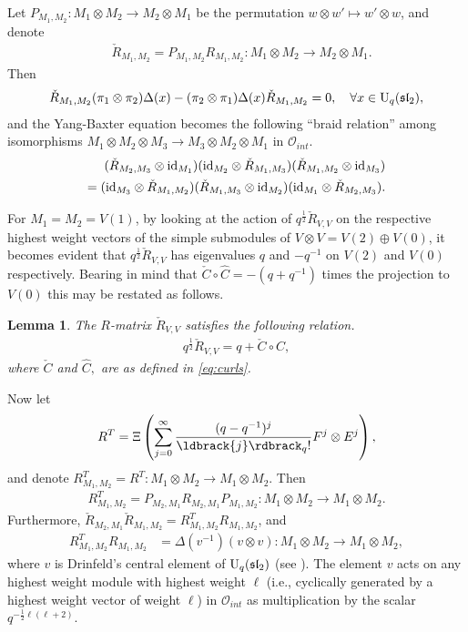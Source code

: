 \documentclass[12pt]{amsart}
\newtheorem{lemma}[theorem]{Lemma}
\theoremstyle{definition}
\theoremstyle{remark}
\numberwithin{equation}{section}
\newcommand{\CO}{{\mathcal O}}
\newcommand{\id}{{\rm{id}}}
\newcommand{\inv}{^{-1}}
\newcommand{\U}{{\rm{U}}}
\newcommand{\fsl}{{\mathfrak {sl}}}
\newcommand{\qint}[1]{\ldbrack{#1}\rdbrack_q }
\begin{document}
Let $
P_{M_1, M_2}: M_1\otimes M_2 \longrightarrow M_2\otimes M_1
$
be the permutation $w\otimes w' \mapsto w'\otimes w$,  and denote
\[
\begin{aligned}
&\check{R}_{M_1, M_2}= P_{M_1, M_2}R_{M_1, M_2}: M_1\otimes M_2 \longrightarrow M_2\otimes M_1. \end{aligned}
\]
Then 
\begin{eqnarray}\label{eq:commute}
\check{R}_{M_1, M_2}  (\pi_1\otimes \pi_2)\Delta(x) - (\pi_2\otimes \pi_1)\Delta(x)\check{R}_{M_1, M_2}=0, \quad \forall x\in \U_q(\fsl_2), 
\end{eqnarray}
and the Yang-Baxter equation becomes the  following ``braid relation''  among isomorphisms
$M_1\otimes M_2\otimes M_3\longrightarrow M_3\otimes M_2\otimes M_1$ in $\CO_{int}$.
\[
\begin{aligned}
(\check{R}_{M_2, M_3}\otimes\id_{M_1})  (\id_{M_2}\otimes\check{R}_{M_1, M_3})  
(\check{R}_{M_1, M_2}\otimes\id_{M_3})\\
=
(\id_{M_3}\otimes\check{R}_{M_1, M_2})  (\check{R}_{M_1, M_3}\otimes\id_{M_2})(\id_{M_1}\otimes\check{R}_{M_2, M_3}).   
\end{aligned}
\]


For $M_1=M_2=V(1)$, by looking at the action of  $q^{\frac{1}{2}}\check{R}_{V, V}$ on the respective highest weight 
vectors of the simple submodules of $V\otimes V=V(2)\oplus V(0)$, it becomes evident that $q^{\frac{1}{2}}\check{R}_{V, V}$ 
 has eigenvalues $q$ and $-q^{-1}$ on $V(2)$ and $V(0)$ respectively. Bearing in mind that $\check{C}\circ\hat{C}=-(q+q\inv)$
times the projection to $V(0)$ this may be restated as follows.
\begin{lemma}\label{eq:normal-R} The $R$-matrix $\check{R}_{V, V}$ satisfies the following relation. 
\begin{eqnarray}\label{lem:normal-R}
q^{\frac{1}{2}}\check{R}_{V, V}=q+\check{C}\circ\hat{C},  
\end{eqnarray}
where $\check{C}$ and $\hat{C},$ are as defined in \eqref{eq:curls}. 
\end{lemma}

Now let 
\begin{eqnarray}
R^T = \Xi \left(\sum_{j=0}^\infty \frac{(q-q^{-1})^j}{\qint{j}!} F^j\otimes E^j\right),  \label{eq:univ-RT}
\end{eqnarray}
and denote $R^T_{M_1, M_2}= R^T:  M_1\otimes M_2 \longrightarrow M_1\otimes M_2$. Then 
\[
\begin{aligned}
R^T_{M_1, M_2}= P_{M_2, M_1}R_{M_2, M_1} P_{M_1, M_2}: M_1\otimes M_2 \longrightarrow M_1\otimes M_2.
\end{aligned}
\]
Furthermore, $\check{R}_{M_2, M_1}\check{R}_{M_1, M_2}=R^T_{M_1, M_2}R_{M_1, M_2}$, and 
\[
\begin{aligned}
R^T_{M_1, M_2}R_{M_1, M_2}
&= \Delta(v^{-1}) (v\otimes v): M_1\otimes M_2 \longrightarrow M_1\otimes M_2,
\end{aligned}
\]
where $v$ is Drinfeld's central element of $\U_q(\fsl_2)$ (see \cite{LZ06}).  The element $v$ acts on any highest 
weight module with highest weight $\ell$ (i.e., cyclically generated by a highest weight vector of
weight $\ell$) in $\CO_{int}$ as multiplication by the scalar  $q^{ -\frac{1}{2}\ell (\ell+2)}$.
\end{document}
